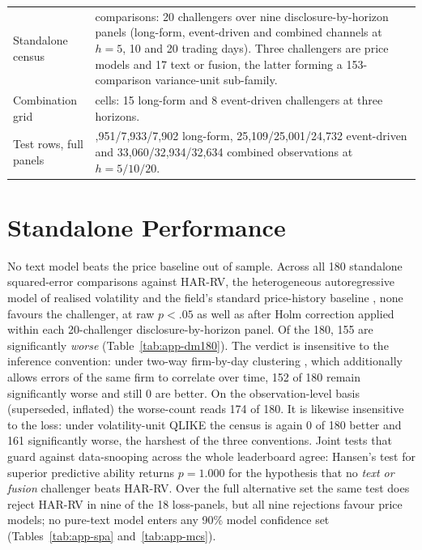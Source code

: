 \begin{center}
{\begin{tabular}{@{}>{\raggedright\arraybackslash}p{}>{\raggedright\arraybackslash}p{}@{}}
Standalone census & 180 comparisons: 20 challengers over nine disclosure-by-horizon panels (long-form, event-driven and combined channels at $h=5$, 10 and 20 trading days). Three challengers are price models and 17 text or fusion, the latter forming a 153-comparison variance-unit sub-family. \\ %
Combination grid & 69 cells: 15 long-form and 8 event-driven challengers at three horizons. \\ %
Test rows, full panels & 7,951/7,933/7,902 long-form, 25,109/25,001/24,732 event-driven and 33,060/32,934/32,634 combined observations at $h=5/10/20$. \\ %
\bottomrule
\end{tabular}
}
\end{center}

\section{Standalone Performance}
\label{sec:res-standalone}

No text model beats the price baseline out of sample. Across all 180 standalone squared-error comparisons against HAR-RV, the heterogeneous autoregressive model of realised volatility and the field's standard price-history baseline \cite{corsi2009har}, none favours the challenger, at raw $p<.05$ as well as after Holm correction applied within each 20-challenger disclosure-by-horizon panel. Of the 180, 155 are significantly \emph{worse} (Table~\ref{tab:app-dm180}). %
The verdict is insensitive to the inference convention: under two-way firm-by-day clustering \cite{cameron2011twoway}, which additionally allows errors of the same firm to correlate over time, 152 of 180 remain significantly worse and still 0 are better. On the observation-level basis (superseded, inflated) the worse-count reads 174 of 180. %
It is likewise insensitive to the loss: under volatility-unit QLIKE the census is again 0 of 180 better and 161 significantly worse, the harshest of the three conventions. %
Joint tests that guard against data-snooping across the whole leaderboard agree: Hansen's test for superior predictive ability returns $p=1.000$ for the hypothesis that no \emph{text or fusion} challenger beats HAR-RV. Over the full alternative set the same test does reject HAR-RV in nine of the 18 loss-panels, but all nine rejections favour price models; no pure-text model enters any 90\% model confidence set \cite{hansen2005spa,hansen2011mcs} (Tables~\ref{tab:app-spa} and~\ref{tab:app-mcs}). %

